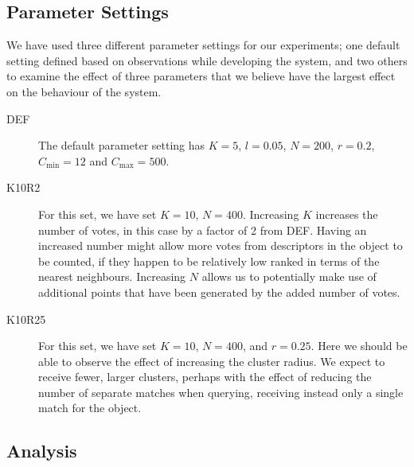 \documentclass[11pt,a4paper]{kth-mag}
\begin{document}
\subsection{Parameter Settings}
We have used three different parameter settings for our experiments; one default
setting defined based on observations while developing the system, and two
others to examine the effect of three parameters that we believe have the
largest effect on the behaviour of the system.
\begin{description}
\item[DEF] The default parameter setting has $K=5$, $l=0.05$, $N=200$, $r=0.2$,
  $C_{\min}=12$ and $C_{\max}=500$.
\item[K10R2] For this set, we have set $K=10$, $N=400$. Increasing $K$ increases
  the number of votes, in this case by a factor of 2 from DEF. Having an
  increased number might allow more votes from descriptors in the object to be
  counted, if they happen to be relatively low ranked in terms of the nearest
  neighbours. Increasing $N$ allows us to potentially make use of additional
  points that have been generated by the added number of votes.
\item[K10R25] For this set, we have set $K=10$, $N=400$, and $r=0.25$. Here we
  should be able to observe the effect of increasing the cluster radius. We
  expect to receive fewer, larger clusters, perhaps with the effect of reducing
  the number of separate matches when querying, receiving instead only a single
  match for the object.
\end{description}

\subsection{Analysis}
\end{document}
